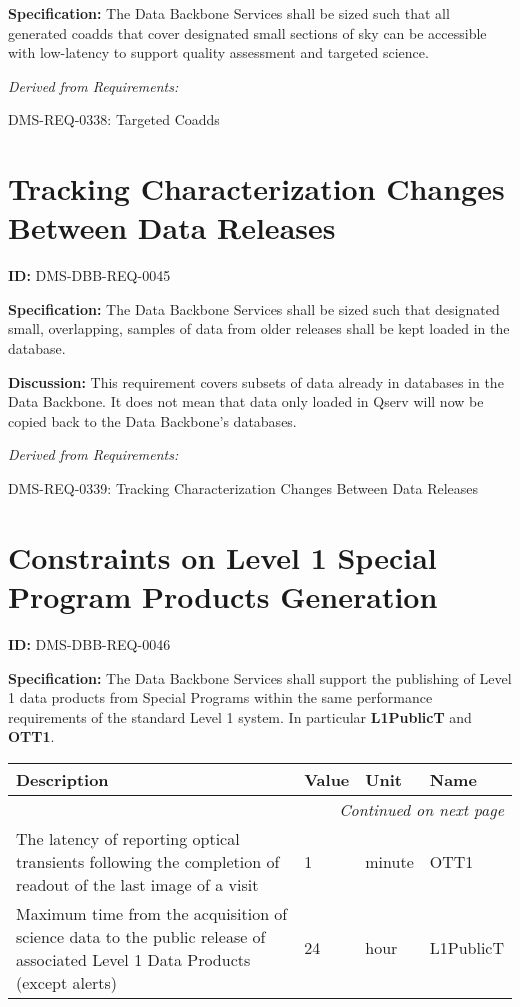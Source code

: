\documentclass[SE,toc,lsstdraft]{lsstdoc}
\makeatletter
\newcommand{\paramname}[1]{\hspace{0pt}#1}
\newcommand{\unitname}[1]{\hspace{0pt}#1}
\newenvironment{parameters}[0]{%
\setlength\LTleft{0pt}
\setlength\LTright{\fill}
\begin{small}
\begin{longtable}[]{|p{0.49\textwidth}|l|p{0.6in}|p{1.70in}@{}|}

\hline \textbf{Description} & \textbf{Value} & \textbf{Unit} & \textbf{Name} \\ \hline
\endhead

\hline \multicolumn{4}{r}{\emph{Continued on next page}} \\
\endfoot

\hline\hline
\endlastfoot
}{%
\hline
\end{longtable}
\end{small}
}
\makeatother
\begin{document}
\textbf{Specification:}
The Data Backbone Services shall be sized such that all generated coadds that cover designated small sections of sky can be accessible with low-latency to support quality assessment and targeted science.

\emph{Derived from Requirements:}

DMS-REQ-0338:
Targeted Coadds \newline

\section{Tracking Characterization Changes Between Data Releases}

\label{DMS-DBB-REQ-0045}
\textbf{ID:} DMS-DBB-REQ-0045

\textbf{Specification:}
The Data Backbone Services shall be sized such that designated small, overlapping, samples of data from older releases shall be kept loaded in the database.

\textbf{Discussion:}
This requirement covers subsets of data already in databases in the Data Backbone.    It does not mean that data only loaded in Qserv will now be copied back to the Data Backbone's databases.

\emph{Derived from Requirements:}

DMS-REQ-0339:
Tracking Characterization Changes Between Data Releases \newline

\section{Constraints on Level 1 Special Program Products Generation}

\label{DMS-DBB-REQ-0046}
\textbf{ID:} DMS-DBB-REQ-0046

\textbf{Specification:}
The Data Backbone Services shall support the publishing of Level 1 data products from Special Programs within the same performance requirements of the standard Level 1 system. In particular \textbf{L1PublicT} and \textbf{OTT1}.

\begin{parameters}
The latency of reporting optical transients following the completion of readout of the last image of a visit
&
1
&
\unitname{%
minute
}
&
\paramname{%
OTT1
} \\\hline
Maximum time from the acquisition of science data to the public release of associated Level 1 Data Products (except alerts)
&
24
&
\unitname{%
hour
}
&
\paramname{%
L1PublicT
} \\\hline
\end{parameters}
\end{document}
